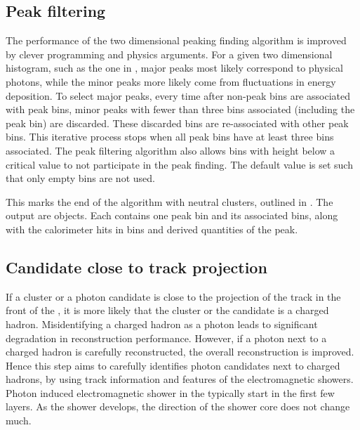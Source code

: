 
\subsection{Peak filtering}

The performance of the two dimensional peaking finding algorithm is improved by clever programming and physics arguments. For a given two dimensional histogram, such as the one in , major peaks most likely correspond to physical photons, while the minor peaks more likely come from fluctuations in energy deposition. To select major peaks, every time after non-peak bins are associated with peak bins, minor peaks with fewer than three bins associated (including the peak bin) are discarded. These discarded bins are re-associated with other peak bins. This iterative process stops when all peak bins have at least three bins associated.  The peak filtering algorithm also allows bins with height below a critical value to not participate in the peak finding. The default value is set such that only empty bins are not used.

This marks the end of the \PhotonReconstruction algorithm with neutral clusters, outlined in . The output are \ShowerPeak objects. Each contains one peak bin and its associated bins, along with the calorimeter hits in bins and derived quantities of the peak.

\subsection{Candidate close to track projection}
\label{sec:photon2Dtrack}
If a cluster or a photon candidate is close to the projection of the track in the front of the \ECAL, it is more likely that the cluster or the candidate is a charged hadron. Misidentifying a charged hadron as a photon leads to significant degradation in reconstruction performance. However, if a photon next to a charged hadron is carefully reconstructed, the overall reconstruction is improved. Hence this step aims to carefully identifies photon candidates next to charged hadrons, by using track information and features of the electromagnetic showers. Photon induced electromagnetic shower in the \ECAL typically start in the first few layers. As the shower develops, the direction of the shower core does not change much.

